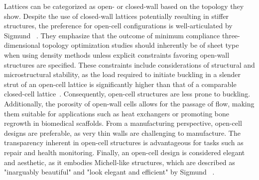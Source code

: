 Lattices can be categorized as open- or closed-wall based on the topology they show. Despite the use of closed-wall lattices potentially resulting in stiffer structures, the preference for open-cell configurations is well-articulated by Sigmund \etal~. They emphasize that the outcome of minimum compliance three-dimensional topology optimization studies should inherently be of sheet type when using density methods unless explicit constraints favoring open-wall structures are specified. These constraints include considerations of structural and microstructural stability, as the load required to initiate buckling in a slender strut of an open-cell lattice is significantly higher than that of a comparable closed-cell lattice~. Consequently, open-cell structures are less prone to buckling. Additionally, the porosity of open-wall cells allows for the passage of flow, making them suitable for applications such as heat exchangers or promoting bone regrowth in biomedical scaffolds. From a manufacturing perspective, open-cell designs are preferable, as very thin walls are challenging to manufacture. The transparency inherent in open-cell structures is advantageous for tasks such as repair and health monitoring. Finally, an open-cell design is considered elegant and aesthetic, as it embodies Michell-like structures, which are described as "inarguably beautiful" and "look elegant and efficient" by Sigmund \etal~\cite{sigmund_non-optimality_2016}.
